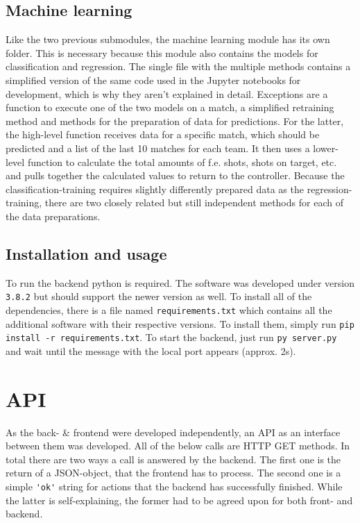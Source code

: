 \subsection{Machine learning}
Like the two previous submodules, the machine learning module has its own folder. This is necessary because this module also contains the models for classification and regression. The single file with the multiple methods contains a simplified version of the same code used in the Jupyter notebooks for development, which is why they aren't explained in detail. Exceptions are a function to execute one of the two models on a match, a simplified retraining method and methods for the preparation of data for predictions. For the latter, the high-level function receives data for a specific match, which should be predicted and a list of the last 10 matches for each team. It then uses a lower-level function to calculate the total amounts of f.e. shots, shots on target, etc. and pulls together the calculated values to return to the controller. Because the classification-training requires slightly differently prepared data as the regression-training, there are two closely related but still independent methods for each of the data preparations.

\subsection{Installation and usage}
To run the backend python is required. The software was developed under version \lstinline[columns=fixed]{3.8.2} but should support the newer version as well. To install all of the dependencies, there is a file named \lstinline[columns=fixed]{requirements.txt} which contains all the additional software with their respective versions. To install them, simply run \lstinline[columns=fixed]{pip install -r requirements.txt}. To start the backend, just run \lstinline[columns=fixed]{py server.py} and wait until the message with the local port appears (approx. 2s).

\section{API}
As the back- \& frontend were developed independently, an API as an interface between them was developed. All of the below calls are HTTP GET methods.
\newline
\newline
In total there are two ways a call is answered by the backend. The first one is the return of a JSON-object, that the frontend has to process. The second one is a simple \lstinline[columns=fixed]{'ok'} string for actions that the backend has successfully finished. While the latter is self-explaining, the former had to be agreed upon for both front- and backend.

